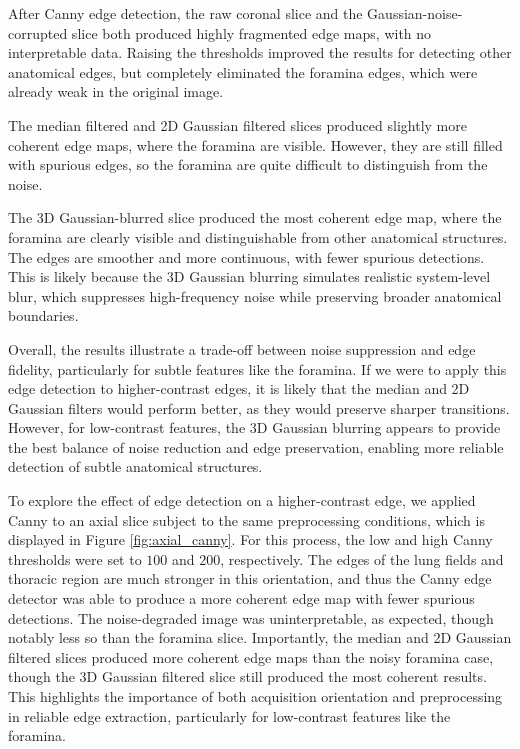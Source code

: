 \documentclass[10pt, twocolumn]{article}
\begin{document}
After Canny edge detection, the raw coronal slice and the Gaussian-noise-corrupted slice both produced highly fragmented edge maps, with no interpretable data. Raising the thresholds improved the results for detecting other anatomical edges, but completely eliminated the foramina edges, which were already weak in the original image.

The median filtered and 2D Gaussian filtered slices produced slightly more coherent edge maps, where the foramina are visible. However, they are still filled with spurious edges, so the foramina are quite difficult to distinguish from the noise.

The 3D Gaussian-blurred slice produced the most coherent edge map, where the foramina are clearly visible and distinguishable from other anatomical structures. The edges are smoother and more continuous, with fewer spurious detections. This is likely because the 3D Gaussian blurring simulates realistic system-level blur, which suppresses high-frequency noise while preserving broader anatomical boundaries.

Overall, the results illustrate a trade-off between noise suppression and edge fidelity, particularly for subtle features like the foramina. If we were to apply this edge detection to higher-contrast edges, it is likely that the median and 2D Gaussian filters would perform better, as they would preserve sharper transitions. However, for low-contrast features, the 3D Gaussian blurring appears to provide the best balance of noise reduction and edge preservation, enabling more reliable detection of subtle anatomical structures.

To explore the effect of edge detection on a higher-contrast edge, we applied Canny to an axial slice subject to the same preprocessing conditions, which is displayed in Figure \ref{fig:axial_canny}. For this process, the low and high Canny thresholds were set to $100$ and $200$, respectively. The edges of the lung fields and thoracic region are much stronger in this orientation, and thus the Canny edge detector was able to produce a more coherent edge map with fewer spurious detections. The noise-degraded image was uninterpretable, as expected, though notably less so than the foramina slice. Importantly, the median and 2D Gaussian filtered slices produced more coherent edge maps than the noisy foramina case, though the 3D Gaussian filtered slice still produced the most coherent results. This highlights the importance of both acquisition orientation and preprocessing in reliable edge extraction, particularly for low-contrast features like the foramina. 
\end{document}
